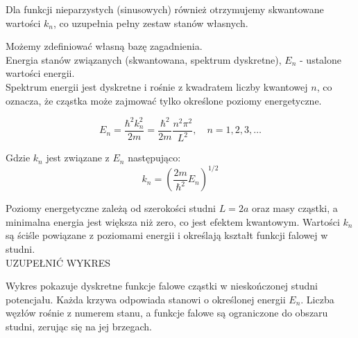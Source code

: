 Dla funkcji nieparzystych (sinusowych) również otrzymujemy skwantowane wartości $k_n$, co uzupełnia pełny zestaw stanów własnych.

Możemy zdefiniować własną bazę zagadnienia. \\
Energia stanów związanych (skwantowana, spektrum dyskretne), $E_n$ - ustalone wartości energii. \\

Spektrum energii jest dyskretne i rośnie z kwadratem liczby kwantowej $n$, co oznacza,
że cząstka może zajmować tylko określone poziomy energetyczne.

\begin{equation*}
    E_n = \frac{\hbar^2 k_n^2}{2m} = \frac{\hbar^2}{2m} \frac{n^2 \pi^2}{L^2}, \quad n = 1, 2, 3, \ldots
\end{equation*}


Gdzie $k_n$ jest związane z $E_n$ następująco:
\begin{equation*}
    k_n = \left( \frac{2 m}{\hbar ^2} E_n \right) ^{1/2}
\end{equation*}

Poziomy energetyczne zależą od szerokości studni $L=2a$ oraz masy cząstki, a minimalna energia jest większa niż zero, co jest efektem kwantowym.
Wartości $k_n$ są ściśle powiązane z poziomami energii i określają kształt funkcji falowej w studni. \\



{{ UZUPEŁNIĆ WYKRES }}

Wykres pokazuje dyskretne funkcje falowe cząstki w nieskończonej studni potencjału.
Każda krzywa odpowiada stanowi o określonej energii $E_n$. Liczba węzłów rośnie z numerem stanu,
a funkcje falowe są ograniczone do obszaru studni, zerując się na jej brzegach.
